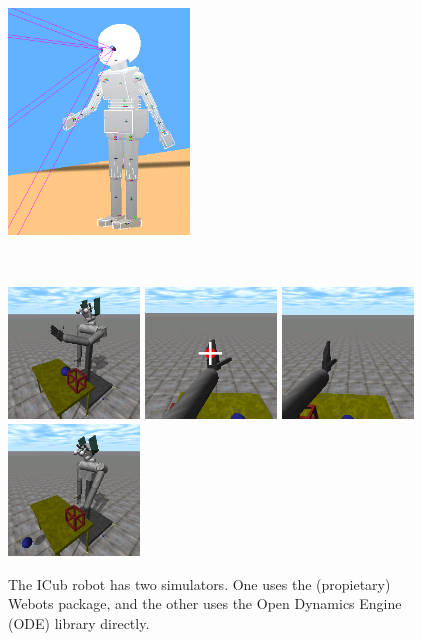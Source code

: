 \begin{figure}[tbp]
\centerline{
\includegraphics[height=6cm]{sim-webot-detail}
}
\ \\
\centerline{
\includegraphics[width=3.5cm]{sim-ode-wide} 
\includegraphics[width=3.5cm]{sim-ode-left} 
\includegraphics[width=3.5cm]{sim-ode-right}
\includegraphics[width=3.5cm]{sim-ode-knock}
}
\caption{
%
The ICub robot has two simulators.
One uses the (propietary) Webots package, and the other uses
the Open Dynamics Engine (ODE) library directly.
}
\end{figure}
